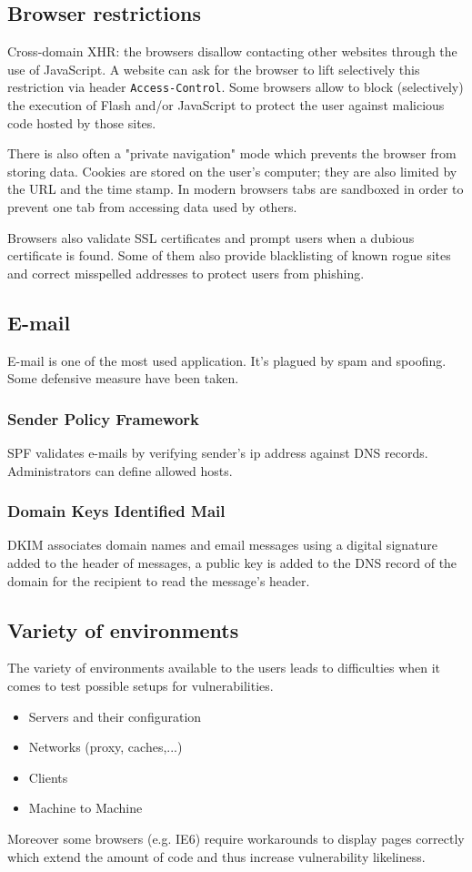 \subsection{Browser restrictions}
Cross-domain XHR: the browsers disallow contacting other websites
through the use of JavaScript. A website can ask for the browser to
lift selectively this restriction via header \texttt{Access-Control}.
Some browsers allow to block (selectively) the execution of Flash and/or
JavaScript to protect the user against malicious code hosted by those sites.

There is also often a "private navigation" mode which prevents the
browser from storing data.
Cookies are stored on the user's computer; they are also limited by the URL
and the time stamp.
In modern browsers tabs are sandboxed in order to prevent one tab from
accessing data used by others.

Browsers also validate SSL certificates and prompt users when a
dubious certificate is found.
Some of them also provide blacklisting of known rogue sites and
correct misspelled addresses to protect users from phishing.

\subsection{E-mail}
E-mail is one of the most used application. It's plagued by spam and
spoofing. Some defensive measure have been taken.

\subsubsection{Sender Policy Framework}
SPF validates e-mails by verifying sender's ip address against DNS records.
Administrators can define allowed hosts.

\subsubsection{Domain Keys Identified Mail}
DKIM associates domain names and email messages using a digital signature
added to the header of messages, a public key is added to the DNS record of
the domain for the recipient to read the message's header.

\subsection{Variety of environments}
The variety of environments available to the users leads to
difficulties when it comes to test possible setups for
vulnerabilities.
\begin{itemize}
\item Servers and their configuration
\item Networks (proxy, caches,...)
\item Clients
\item Machine to Machine
\end{itemize}
Moreover some browsers (e.g. IE6) require workarounds to
display pages correctly which extend the amount of code and thus
increase vulnerability likeliness.

